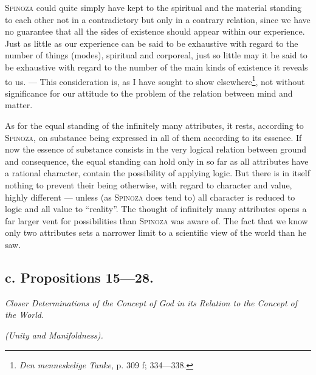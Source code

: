 \documentclass[12pt]{article}
\newcommand{\opage}[1]{\marginnote{\footnotesize\textit{[#1]}}}
\begin{document}
\opage{24}\textsc{Spinoza} could quite simply have kept to the spiritual and the
material standing to each other not in a contradictory but only in a contrary
relation, since we have no guarantee that all the sides of existence should appear
within our experience. Just as little as our experience can be said to be exhaustive
with regard to the number of things (modes), spiritual and corporeal, just so little
may it be said to be exhaustive with regard to the number of the main kinds of
existence it reveals to us. --- This consideration is, as I have sought to show
elsewhere\footnote{\textit{Den menneskelige Tanke}, p. 309 f; 334---338.}, not
without significance for our attitude to the problem of the relation between mind and
matter.

As for the equal standing of the infinitely many attributes, it rests, according to
\textsc{Spinoza}, on substance being expressed in all of them according to its essence.
If now the essence of substance consists in the very logical relation between ground
and consequence, the equal standing can hold only in so far as all attributes have a
rational character, contain the possibility of applying logic. But there is in itself
nothing to prevent their being otherwise, with regard to character and value, highly
different --- unless (as \textsc{Spinoza} does tend to) all character is reduced to
logic and all value to ``reality''. The thought of infinitely many attributes opens a
far larger vent for possibilities than \textsc{Spinoza} was aware of. The fact that we
know only two attributes sets a narrower limit to a scientific view of the world than
he saw.

\subsection*{c. Propositions 15---28.}
\begin{center}\textit{Closer Determinations of the Concept of God in its Relation to
the Concept of the World.}\end{center}
\begin{center}\textit{(Unity and Manifoldness).}\end{center}
\end{document}
